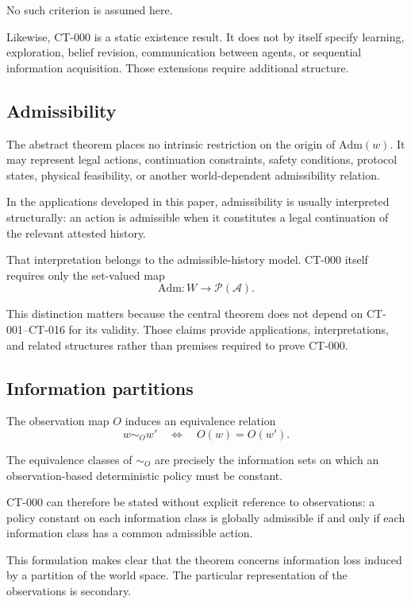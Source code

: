 \documentclass[11pt]{article}
\theoremstyle{definition}
\theoremstyle{remark}
\newcommand{\worlds}{W}
\newcommand{\acts}{\mathcal{A}}
\newcommand{\admissible}{\mathrm{Adm}}
\begin{document}
No such criterion is assumed here.

Likewise, CT-000 is a static existence result. It does not by itself specify
learning, exploration, belief revision, communication between agents, or
sequential information acquisition. Those extensions require additional
structure.

\subsection{Admissibility}

The abstract theorem places no intrinsic restriction on the origin of
$\admissible(w)$. It may represent legal actions, continuation constraints,
safety conditions, protocol states, physical feasibility, or another
world-dependent admissibility relation.

In the applications developed in this paper, admissibility is usually
interpreted structurally: an action is admissible when it constitutes a legal
continuation of the relevant attested history.

That interpretation belongs to the admissible-history model. CT-000 itself
requires only the set-valued map
\[
  \admissible:\worlds\to\mathcal{P}(\acts).
\]

This distinction matters because the central theorem does not depend on
CT-001--CT-016 for its validity. Those claims provide applications,
interpretations, and related structures rather than premises required to
prove CT-000.

\subsection{Information partitions}

The observation map $O$ induces an equivalence relation
\[
  w\sim_O w'
  \quad\Longleftrightarrow\quad
  O(w)=O(w').
\]

The equivalence classes of $\sim_O$ are precisely the information sets on
which an observation-based deterministic policy must be constant.

CT-000 can therefore be stated without explicit reference to observations:
a policy constant on each information class is globally admissible if and
only if each information class has a common admissible action.

This formulation makes clear that the theorem concerns information loss
induced by a partition of the world space. The particular representation of
the observations is secondary.
\end{document}
